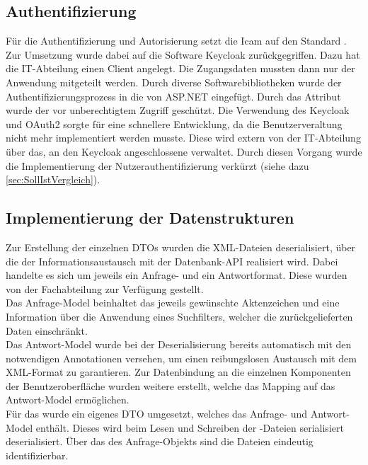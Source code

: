 \subsection{Authentifizierung}
\label{sec:Authentifizierung}
Für die Authentifizierung und Autorisierung setzt die \acs{Icam} auf den Standard .
Zur Umsetzung wurde dabei auf die Software Keycloak zurückgegriffen. Dazu hat die IT-Abteilung einen Client 
angelegt. Die Zugangsdaten mussten dann nur der Anwendung mitgeteilt werden. Durch diverse Softwarebibliotheken 
wurde der Authentifizierungsprozess in die  von ASP.NET eingefügt. Durch das Attribut 
\Methode{[Authorize]} wurde der  vor unberechtigtem Zugriff geschützt. Die Verwendung 
des Keycloak und OAuth2 sorgte für eine schnellere Entwicklung, da die Benutzerveraltung nicht mehr implementiert
werden musste. Diese wird extern von der IT-Abteilung über das, an den Keycloak angeschlossene 
 verwaltet. Durch diesen Vorgang wurde die Implementierung der Nutzerauthentifizierung 
verkürzt (siehe dazu \ref{sec:SollIstVergleich}).


\subsection{Implementierung der Datenstrukturen}
\label{sec:ImplementierungDatenstrukturen}
Zur Erstellung der einzelnen \acs{DTO}s wurden die XML-Dateien deserialisiert, über die der Informationsaustausch mit der Datenbank-\acs{API}
realisiert wird. Dabei handelte es sich um jeweils ein Anfrage- und ein Antwortformat. Diese wurden von der Fachabteilung zur Verfügung
gestellt.\\
Das Anfrage-Model beinhaltet das jeweils gewünschte Aktenzeichen und eine Information über die Anwendung eines Suchfilters,
welcher die zurückgelieferten Daten einschränkt.\\
Das Antwort-Model wurde bei der Deserialisierung bereits automatisch mit den notwendigen Annotationen versehen,
um einen reibungslosen Austausch mit dem XML-Format zu garantieren. Zur Datenbindung an die einzelnen Komponenten der
Benutzeroberfläche wurden weitere  erstellt, welche das Mapping auf das Antwort-Model ermöglichen.\\
Für das  wurde ein eigenes \acs{DTO} umgesetzt, welches das Anfrage- und Antwort-Model enthält.
Dieses wird beim Lesen und Schreiben der -Dateien serialisiert \bzw deserialisiert.
Über das  des Anfrage-Objekts sind die Dateien eindeutig identifizierbar.


